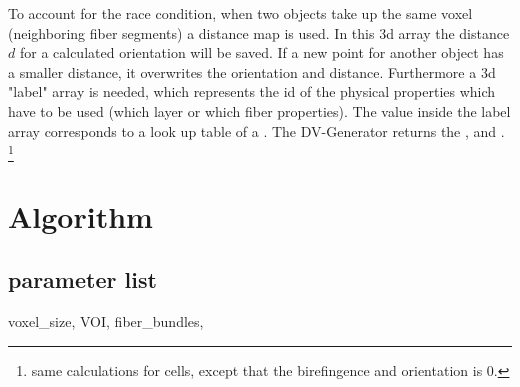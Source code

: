 % 
To account for the race condition, when two objects take up the same voxel (\eg neighboring fiber segments) a distance map  is used.
In this 3d array the distance $d$ for a calculated orientation will be saved.
If a new point for another object has a smaller distance, it overwrites the orientation and distance.
Furthermore a 3d "label" array is needed, which represents the id of the physical properties which have to be used (\eg which layer or which fiber properties).
The value inside the label array corresponds to a look up table of a .
% 
The DV-Generator returns the ,  and .
% 
\footnote{same calculations for cells, except that the birefingence and orientation is $0$.}
% 
\section{Algorithm}
% 
\subsection{parameter list}
% 
voxel\_size, VOI, fiber\_bundles, \dummy{}
% 

